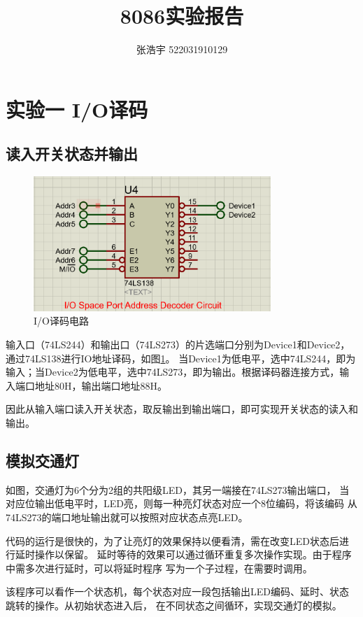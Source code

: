 \documentclass[12pt, a4paper, oneside]{ctexart}
\title{\textbf{8086实验报告}}
\author{张浩宇 522031910129}
\date{}
\begin{document}
    \maketitle
    \section{实验一 I/O译码}
    \subsection{读入开关状态并输出}
    \begin{figure}[!h]
        \centering
        \includegraphics[width=0.8\textwidth]{img/fig1-183decoder.png}
        \caption{I/O译码电路}
        \label{fig:decoder}
    \end{figure} 
    输入口（74LS244）和输出口（74LS273）的片选端口分别为Device1和Device2，通过74LS138进行IO地址译码，如图{\ref{fig:decoder}}。
    当Device1为低电平，选中74LS244，即为输入；当Device2为低电平，选中74LS273，即为输出。根据译码器连接方式，输入端口地址80H，输出端口地址88H。
    
    因此从输入端口读入开关状态，取反输出到输出端口，即可实现开关状态的读入和输出。
    \subsection{模拟交通灯}
    如图，交通灯为6个分为2组的共阳级LED，其另一端接在74LS273输出端口，
    当对应位输出低电平时，LED亮，则每一种亮灯状态对应一个8位编码，将该编码
    从74LS273的端口地址输出就可以按照对应状态点亮LED。

    代码的运行是很快的，为了让亮灯的效果保持以便看清，需在改变LED状态后进行延时操作以保留。
    延时等待的效果可以通过循环重复多次操作实现。由于程序中需多次进行延时，可以将延时程序
    写为一个子过程，在需要时调用。

    该程序可以看作一个状态机，每个状态对应一段包括输出LED编码、延时、状态跳转的操作。从初始状态进入后，
    在不同状态之间循环，实现交通灯的模拟。
\end{document}
